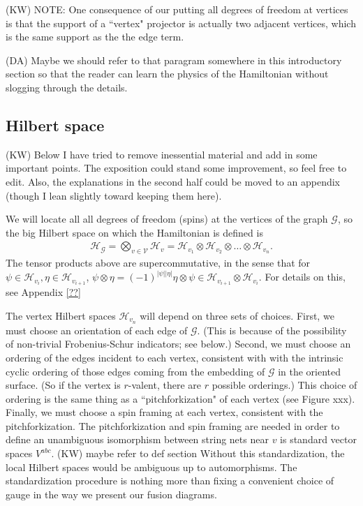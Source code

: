 \documentclass[12pt,a4paper]{article}
\newcommand{\tp}{\otimes}
\newcommand{\mcg}{\mathcal{G}}
\newcommand{\mch}{\mathcal{H}}
\newcommand{\mcv}{\mathcal{V}}
\newcommand{\dave}[1]{{\color{ao(english)}\footnotesize{(DA) #1}}}
\newcommand{\ethan}[1]{{\color{amethyst}\footnotesize{(EL) #1}}}
\newcommand{\kw}[1]{{\color{kwcolor}\footnotesize{(KW) #1}}}
\begin{document}
\kw{NOTE: One consequence of our putting all degrees of freedom at vertices is that the support of a ``vertex" projector is actually two adjacent vertices, 
which is the same support as the the edge term.}

\dave{Maybe we should refer to that paragram somewhere in this introductory section so that the reader can learn the physics of the Hamiltonian without slogging through the details.}


\subsection{Hilbert space} \label{hilbertspacesect}

\kw{Below I have tried to remove inessential material and add in some important points.
The exposition could stand some improvement, so feel free to edit.
Also, the explanations in the second half could be moved to an appendix (though I lean slightly toward keeping them here).}

We will locate all all degrees of freedom (spins) at the vertices of the graph $\mcg$, so
the big Hilbert space on which the Hamiltonian is defined is
\begin{align}	\label{GraphHilbertSpace}
 \mch_\mcg =\bigotimes_{v \in \mcv} \mch_v  = \mch_{v_1} \tp \mch_{v_{2}} \tp \dots \tp \mch_{v_n} .
\end{align}
The tensor products above are supercommutative, in the sense that for $\psi\in \mch_{v_i},\eta\in \mch_{v_{i+1}}$, $\psi \tp \eta = (-1)^{|\psi||\eta|}\eta\tp\psi \in \mch_{v_{i+1}} \tp \mch_{v_i}$. 
For details on this, see Appendix \ref{??}

The vertex Hilbert spaces $\mch_{v_n}$ will depend on three sets of choices.
First, we must choose an orientation of each edge of $\mcg$.
(This is because of the possibility of non-trivial Frobenius-Schur indicators; see below.)
Second, we must choose an ordering of the edges incident to each vertex, consistent with with the intrinsic cyclic ordering of those edges
coming from the embedding of $\mcg$ in the oriented surface.
(So if the vertex is $r$-valent, there are $r$ possible orderings.)
This choice of ordering is the same thing as a ``pitchforkization" of each vertex (see Figure xxx).
Finally, we must choose a spin framing at each vertex, consistent with the pitchforkization.
The pitchforkization and spin framing are needed in order to define an unambiguous
isomorphism between string nets near $v$ is standard vector spaces $V^{abc}$.
\kw{maybe refer to def section}
Without this standardization, the local Hilbert spaces would be ambiguous up to automorphisms. 
The standardization procedure is nothing more than fixing a convenient choice of gauge in the way we present our fusion diagrams. 
\end{document}
